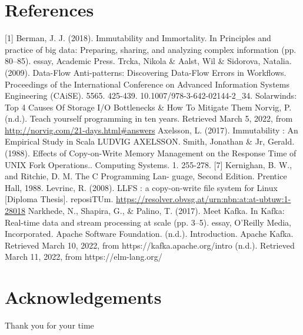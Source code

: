 \documentclass[12pt,twoside]{article}
\begin{document}



\newpage
{}
\setcounter{page}{1}
\section{References}
[1] Berman, J. J. (2018). Immutability and Immortality. In Principles and practice of big data: Preparing, sharing, and analyzing complex information (pp. 80–85). essay, Academic Press. \newline
[2] Trcka, Nikola \& Aalst, Wil \& Sidorova, Natalia. (2009). Data-Flow Anti-patterns: Discovering Data-Flow Errors in Workflows. Proceedings of the International Conference on Advanced Information Systems Engineering (CAiSE). 5565. 425-439. 10.1007/978-3-642-02144-2_34. \newline
[3] Solarwinds: Top 4 Causes Of Storage I/O Bottlenecks \& How To Mitigate Them \newline
[4] Norvig, P. (n.d.). Teach yourself programming in ten years. Retrieved March 5, 2022, from \url{http://norvig.com/21-days.html#answers} \newline
[5] Axelsson, L. (2017). Immutability : An Empirical Study in Scala LUDVIG AXELSSON. \newline 
[6] Smith, Jonathan \& Jr, Gerald. (1988). Effects of Copy-on-Write Memory Management on the Response Time of UNIX Fork Operations.. Computing Systems. 1. 255-278.
[7] Kernighan, B. W., and Ritchie, D. M. The C Programming Lan-
guage, Second Edition. Prentice Hall, 1988. \newline
[8] Levrinc, R. (2008). LLFS : a copy-on-write file system for Linux [Diploma Thesis]. reposiTUm. \url{https://resolver.obvsg.at/urn:nbn:at:at-ubtuw:1-28018} \newline
[9] Narkhede, N., Shapira, G., \& Palino, T. (2017). Meet Kafka. In Kafka: Real-time data and stream processing at scale (pp. 3–5). essay, O'Reilly Media, Incorporated. \newline
[10] Apache Software Foundation. (n.d.). Introduction. Apache Kafka. Retrieved March 10, 2022, from https://kafka.apache.org/intro \newline
[11]  (n.d.). Retrieved March 11, 2022, from https://elm-lang.org/ 







\newpage
\section{Acknowledgements}
Thank you for your time

\printbibliography
\end{document}
